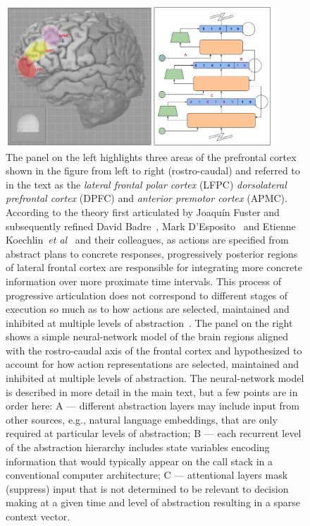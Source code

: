 \documentclass[letterpaper,11pt]{article}
\def\colorred#1{{\color{red}#1}}
\def\urlh#1{{}}
\def\emdash{---}
\def\etal{{\em{et al}}}
\begin{document}

\begin{figure}
%
  \begin{center} 
    \includegraphics[height=150pt]{./figures/Prefrontal_Hierarchy_Biology_Graze.jpg} 
  \end{center}
%
  \caption{%
%
    The panel on the left highlights three areas of the prefrontal cortex shown in the figure from left to right (rostro-caudal) and referred to in the text as the {\it{lateral frontal polar cortex}} (\colorred{LFPC}) {\it{dorsolateral prefrontal cortex}} (\colorred{DPFC}) and {\it{anterior premotor cortex}} (\colorred{APMC}). According to the theory first articulated by Joaqu\'{i}n Fuster and subsequently refined David Badre~\cite{BadreandWagnerNEURON-04}, Mark D'Esposito~\cite{DEspositoetalNATURE-95} and Etienne Koechlin~\etal~\cite{KoechlinetalSCIENCE-03} and their colleagues, as actions are specified from abstract plans to concrete responses, progressively posterior regions of lateral frontal cortex are responsible for integrating more concrete information over more proximate time intervals. This process of progressive articulation does not correspond to different stages of execution so much as to how actions are selected, maintained and inhibited at multiple levels of abstraction~\cite{BadreTiCS-08}. The panel on the right shows a simple neural-network model of the brain regions aligned with the rostro-caudal axis of the frontal cortex and hypothesized to account for how action representations are selected, maintained and inhibited at multiple levels of abstraction. The neural-network model is described in more detail in the main text, but a few points are in order here: {\colorred{A}} {\emdash{}} different abstraction layers may include input from other sources, e.g., natural language embeddings, that are only required at particular levels of abstraction; {\colorred{B}} {\emdash{}} each recurrent level of the abstraction hierarchy includes state variables encoding information that would typically appear on the call stack in a conventional computer architecture; {\colorred{C}} {\emdash{}} attentional layers mask (suppress) input that is not determined to be relevant to decision making at a given time and level of abstraction resulting in a sparse context vector.}
%
  \label{fig_prefer}
%
\end{figure}
\end{document}
